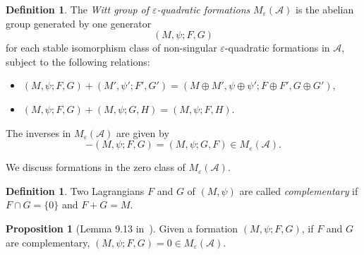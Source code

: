 \documentclass{article}
\theoremstyle{definition}
\newtheorem{defn}[theorem]{Definition}
\newtheorem{prop}[theorem]{Proposition}
\newcommand{\CA}{{ \mathcal A}}
\begin{document}
\begin{defn}
The \emph{Witt group of \( \varepsilon \)-quadratic formations} \( M_\varepsilon(\mathcal{A}) \) is the abelian group generated by one generator
\[
(M, \psi; F, G)
\]
for each stable isomorphism class of non-singular \( \varepsilon \)-quadratic formations in \( \mathcal{A} \), subject to the following relations:

\begin{itemize}
  \item[(i)] \( (M, \psi; F, G) + (M', \psi'; F', G') = (M \oplus M', \psi \oplus \psi'; F \oplus F', G \oplus G') \),
  \item[(ii)] \( (M, \psi; F, G) + (M, \psi; G, H) = (M, \psi; F, H) \).
\end{itemize}

The inverses in \( M_\varepsilon(\mathcal{A}) \) are given by
\[
-(M, \psi; F, G) = (M, \psi; G, F)  \in M_\varepsilon(\mathcal{A}).
\]
\end{defn} 
We discuss formations in the zero class of $M_\varepsilon(\CA)$.
\begin{defn}
    Two Lagrangians $F$ and $G$ of $(M, \psi)$ are called \emph{complementary} if $F\cap G=\{0\}$ and $F+G=M$.
\end{defn}
\begin{prop} [Lemma 9.13 in~\cite{luck2024surgery}]
    Given a formation $(M, \psi; F, G)$, if $F$ and $G$ are complementary, $(M, \psi; F, G)=0\in M_\varepsilon(\CA).$
\end{prop}
\end{document}
